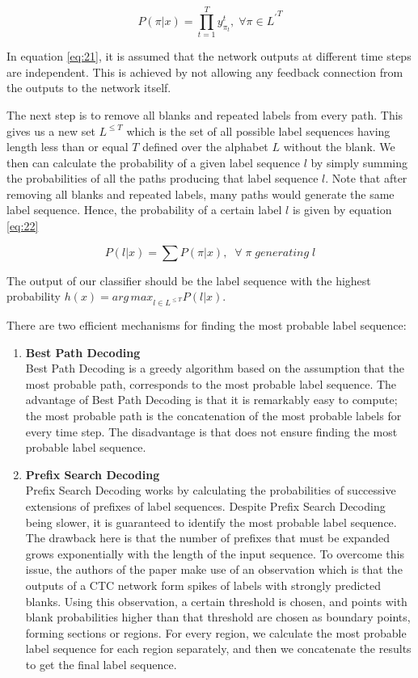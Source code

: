 \begin{equation}
\label{eq:21}
P(\pi|x) = \prod_{t=1}^{T} y_{\pi_t}^{t}, \; \forall \pi \in {{L^{'}}^T}
\end{equation}

In equation \ref{eq:21}, it is assumed that the network outputs at different time steps are independent. This is achieved by not allowing any feedback connection from the outputs to the network itself.

The next step is to remove all blanks and repeated labels from every path. This gives us a new set $L^{\leq T}$ which is the set of all possible label sequences having length less than or equal $T$ defined over the alphabet $L$ without the blank. We then can calculate the probability of a given label sequence $l$ by simply summing the probabilities of all the paths producing that label sequence $l$. Note that after removing all blanks and repeated labels, many paths would generate the same label sequence. Hence, the probability of a certain label $l$ is given by equation \ref{eq:22}

\begin{equation}
\label{eq:22}
P(l|x) = \sum P(\pi|x), \; \;  \forall \; \pi \; generating \; l
\end{equation}


The output of our classifier should be the label sequence with the highest probability $h(x) = {arg \, max}_{l \in {L^{\leq T}}} P(l|x)$.

There are two efficient mechanisms for finding the most probable label sequence:
\begin{enumerate}
	\item \textbf{Best Path Decoding} \mbox{}\\
	 Best Path Decoding is a greedy algorithm based on the assumption that the most probable path, corresponds to the most probable label sequence. The advantage of Best Path Decoding is that it is remarkably easy to compute; the most probable path is the concatenation of the most probable labels for every time step. The disadvantage is that does not ensure finding the most probable label sequence.
	\item \textbf{Prefix Search Decoding} \mbox{}\\
	Prefix Search Decoding works by calculating the probabilities of successive extensions of prefixes of label sequences. Despite Prefix Search Decoding being slower, it is guaranteed to identify the most probable label sequence. The drawback here is that the number of prefixes that must be expanded grows exponentially with the length of the input sequence. To overcome this issue, the authors of the paper make use of an observation which is that the outputs of a \ac{CTC} network form spikes of labels with strongly predicted blanks. Using this observation, a certain threshold is chosen, and points with blank probabilities higher than that threshold are chosen as boundary points, forming sections or regions. For every region, we calculate the most probable label sequence for each region separately, and then we concatenate the results to get the final label sequence. 
\end{enumerate} 


